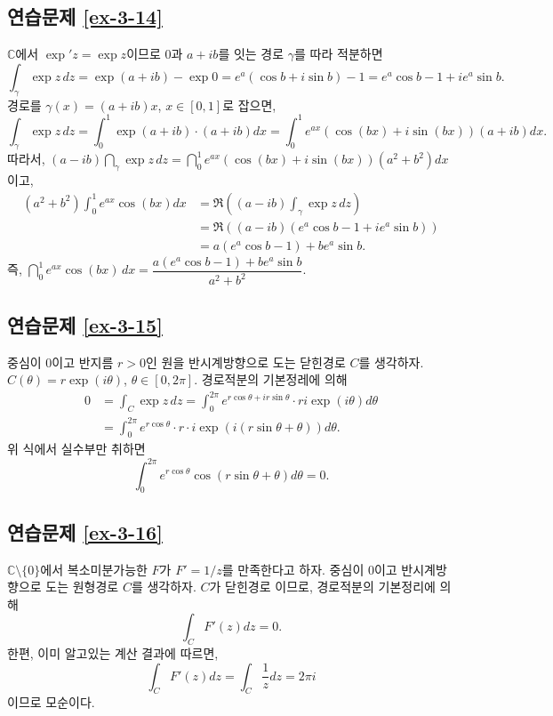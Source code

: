 \subsection*{연습문제 \ref{ex-3-14}}

$\mathbb C$에서  $\exp' z = \exp z$이므로
$0$과 $a+ib$를 잇는 경로 $\gamma$를 따라 적분하면
\[
\int_\gamma \exp z\, dz = \exp(a+ib) - \exp 0 = e^a(\cos b + i \sin b) -1
= e^a\cos b -1 +ie^a\sin b.
\]
 경로를 $\gamma(x) = (a+ib)x$, $x\in[0,1]$로 잡으면,
\[
\int_\gamma \exp z\, dz = \int_0^1 \exp(a+ib)\cdot (a+ib)dx
= \int_0^1 e^{ax}(\cos(bx) + i\sin(bx))(a+ib)dx.
\]
 따라서,
$(a-ib)\dint_\gamma \exp z\, dz = \dint_0^1 e^{ax}(\cos(bx) + i\sin(bx))(a^2+b^2)dx$이고,
\begin{align*}
(a^2+b^2) \int_0^1 e^{ax} \cos (bx)dx
&= \Re\left( (a-ib)\int_\gamma \exp z\, dz \right) \\
&= \Re((a-ib)(e^a\cos b -1 + ie^a\sin b)) \\
&= a(e^a\cos b -1) + be^a \sin b.
\end{align*}
즉,
$\dint_0^1 e^{ax}\cos(bx)\, dx = \dfrac{a(e^a\cos b - 1) + be^a\sin b}{a^2+b^2}$.

\subsection*{연습문제 \ref{ex-3-15}}

중심이 $0$이고 반지름 $r>0$인 원을 반시계방향으로 도는 닫힌경로 $C$를 생각하자.
$C(\theta) = r\exp(i\theta)$, $\theta\in[0,2\pi]$.
경로적분의 기본정레에 의해
\begin{align*}
0 & = \int_C \exp z \, dz = \int_0^{2\pi} e^{r\cos\theta +ir\sin\theta}
\cdot ri\exp(i\theta)d\theta\\
&= \int_0^{2\pi} e^{r\cos\theta} \cdot r\cdot i \exp(i(r\sin\theta +\theta))d\theta.
\end{align*}
위 식에서 실수부만 취하면
\[
\int_0^{2\pi} e^{r\cos\theta} \cos(r\sin \theta + \theta)d\theta = 0.
\]

\subsection*{연습문제 \ref{ex-3-16}}

$\mathbb C\setminus\{0\}$에서 복소미분가능한 $F$가 $F'=1/z$를 만족한다고 하자.
중심이 $0$이고 반시계방향으로 도는 원형경로 $C$를 생각하자.
$C$가 닫힌경로 이므로, 경로적분의 기본정리에 의해
\[
\int_C F'(z)dz = 0.
\]
한편, 이미 알고있는 계산 결과에 따르면,
\[
\int_C F'(z)dz = \int_C \dfrac1z dz = 2\pi i
\]
이므로 모순이다.

